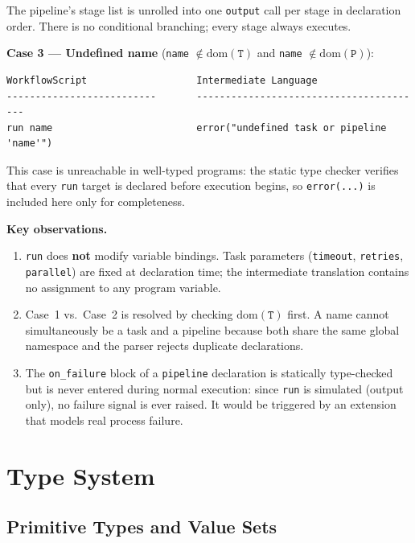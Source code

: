 \documentclass[10pt,a4paper]{article}
\begin{document}
The pipeline's stage list is unrolled into one \texttt{output} call per stage in declaration
order. There is no conditional branching; every stage always executes.

\textbf{Case 3 --- Undefined name}
(\texttt{name} $\notin \mathrm{dom}(\mathtt{T})$ and \texttt{name} $\notin \mathrm{dom}(\mathtt{P})$):

\begin{lstlisting}[language={}, caption={Run undefined name translation}]
WorkflowScript                   Intermediate Language
--------------------------       ----------------------------------------
run name                         error("undefined task or pipeline 'name'")
\end{lstlisting}

This case is unreachable in well-typed programs: the static type checker verifies that every
\texttt{run} target is declared before execution begins, so \texttt{error(...)} is included
here only for completeness.

\textbf{Key observations.}
\begin{enumerate}
    \item \texttt{run} does \textbf{not} modify variable bindings. Task parameters
          (\texttt{timeout}, \texttt{retries}, \texttt{parallel}) are fixed at declaration
          time; the intermediate translation contains no assignment to any program variable.
    \item Case~1 vs.\ Case~2 is resolved by checking $\mathrm{dom}(\mathtt{T})$ first.
          A name cannot simultaneously be a task and a pipeline because both share the same
          global namespace and the parser rejects duplicate declarations.
    \item The \texttt{on\_failure} block of a \texttt{pipeline} declaration is statically
          type-checked but is never entered during normal execution: since \texttt{run} is
          simulated (output only), no failure signal is ever raised. It would be triggered
          by an extension that models real process failure.
\end{enumerate}

\section{Type System}

\subsection{Primitive Types and Value Sets}
\end{document}
